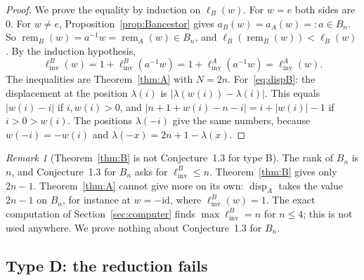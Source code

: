 \documentclass[11pt]{amsart}
\theoremstyle{definition}
\theoremstyle{remark}
\newtheorem{remark}[theorem]{Remark}
\numberwithin{equation}{section}
\newcommand{\linv}{\ell_{\mathrm{inv}}}
\newcommand{\abs}[1]{\lvert #1\rvert}
\DeclareMathOperator{\rem}{rem}
\DeclareMathOperator{\disp}{disp}
\begin{document}
\begin{proof}
We prove the equality by induction on \(\ell_B(w)\). For \(w=e\) both sides are \(0\). For \(w\neq e\), Proposition~\ref{prop:Bancestor} gives \(a_B(w)=a_A(w)=:a\in B_n\). So \(\rem_B(w)=a^{-1}w=\rem_A(w)\in B_n\), and \(\ell_B(\rem_B(w))<\ell_B(w)\). By the induction hypothesis,
\[
\linv^B(w)=1+\linv^B(a^{-1}w)=1+\linv^A(a^{-1}w)=\linv^A(w).
\]
The inequalities are Theorem~\ref{thm:A} with \(N=2n\). For~\eqref{eq:dispB}: the displacement at the position \(\lambda(i)\) is \(\abs{\lambda(w(i))-\lambda(i)}\). This equals \(\abs{w(i)-i}\) if \(i,w(i)>0\), and \(\abs{n+1+w(i)-n-i}=i+\abs{w(i)}-1\) if \(i>0>w(i)\). The positions \(\lambda(-i)\) give the same numbers, because \(w(-i)=-w(i)\) and \(\lambda(-x)=2n+1-\lambda(x)\).
\end{proof}

\begin{remark}[Theorem~\ref{thm:B} is not Conjecture~1.3 for type B]\label{rem:B}
The rank of \(B_n\) is \(n\), and Conjecture~1.3 for \(B_n\) asks for \(\linv^B\le n\). Theorem~\ref{thm:B} gives only \(2n-1\). Theorem~\ref{thm:A} cannot give more on its own: \(\disp_A\) takes the value \(2n-1\) on \(B_n\), for instance at \(w=-\mathrm{id}\), where \(\linv^B(w)=1\). The exact computation of Section~\ref{sec:computer} finds \(\max\linv^B=n\) for \(n\le4\); this is not used anywhere. We prove nothing about Conjecture~1.3 for \(B_n\).
\end{remark}

\subsection{Type D: the reduction fails}
\end{document}
